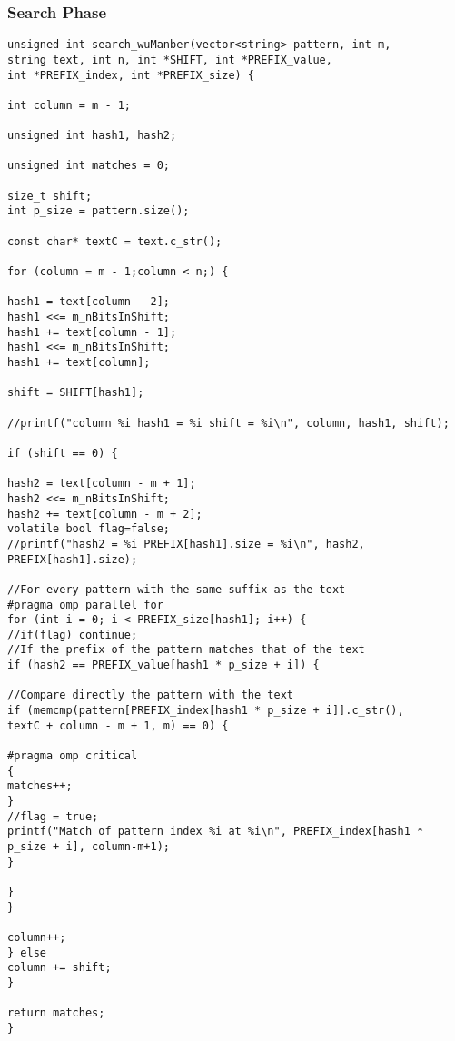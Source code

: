 \subsubsection{Search Phase}
\begin{lstlisting}
unsigned int search_wuManber(vector<string> pattern, int m,
string text, int n, int *SHIFT, int *PREFIX_value,
int *PREFIX_index, int *PREFIX_size) {

int column = m - 1;

unsigned int hash1, hash2;

unsigned int matches = 0;

size_t shift;
int p_size = pattern.size();

const char* textC = text.c_str();

for (column = m - 1;column < n;) {

hash1 = text[column - 2];
hash1 <<= m_nBitsInShift;
hash1 += text[column - 1];
hash1 <<= m_nBitsInShift;
hash1 += text[column];

shift = SHIFT[hash1];

//printf("column %i hash1 = %i shift = %i\n", column, hash1, shift);

if (shift == 0) {

hash2 = text[column - m + 1];
hash2 <<= m_nBitsInShift;
hash2 += text[column - m + 2];
volatile bool flag=false;
//printf("hash2 = %i PREFIX[hash1].size = %i\n", hash2, PREFIX[hash1].size);

//For every pattern with the same suffix as the text
#pragma omp parallel for
for (int i = 0; i < PREFIX_size[hash1]; i++) {
//if(flag) continue;
//If the prefix of the pattern matches that of the text
if (hash2 == PREFIX_value[hash1 * p_size + i]) {

//Compare directly the pattern with the text
if (memcmp(pattern[PREFIX_index[hash1 * p_size + i]].c_str(),
textC + column - m + 1, m) == 0) {

#pragma omp critical
{
matches++;
}
//flag = true;
printf("Match of pattern index %i at %i\n", PREFIX_index[hash1 * p_size + i], column-m+1);
}

}
}

column++;
} else
column += shift;
}

return matches;
}
\end{lstlisting}
\vspace{\topsep}
